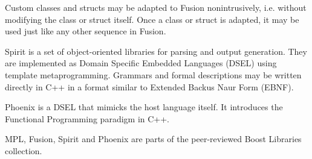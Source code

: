 Custom classes and structs may be adapted to Fusion nonintrusively, i.e. without
modifying the class or struct itself. Once a class or struct is adapted, it may
be used just like any other sequence in Fusion.

Spirit is a set of object-oriented libraries for parsing and output generation.
They are implemented as Domain Specific Embedded Languages (DSEL) using template
metaprogramming. Grammars and formal descriptions may be written directly in C++
in a format similar to Extended Backus Naur Form (EBNF).

Phoenix is a DSEL that mimicks the host language itself. It introduces the
Functional Programming paradigm in C++.

MPL, Fusion, Spirit and Phoenix are parts of the peer-reviewed Boost Libraries 
collection.

